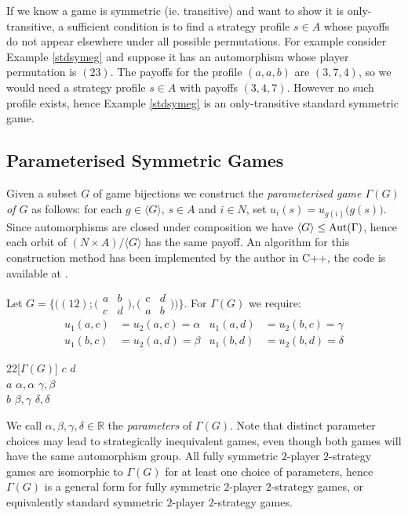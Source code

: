 If we know a game is symmetric (ie. transitive) and want to show it is only-transitive, a sufficient condition is to find a strategy profile $s \in A$ whose payoffs do not appear elsewhere under all possible permutations. For example consider Example \ref{stdsymeg} and suppose it has an automorphism whose player permutation is $(23)$. The payoffs for the profile $(a, a, b)$ are $(3, 7, 4)$, so we would need a strategy profile $s \in A$ with payoffs $(3, 4, 7)$. However no such profile exists, hence Example \ref{stdsymeg} is an only-transitive standard symmetric game.

\subsection{Parameterised Symmetric Games} \label{sec:parameterisedgames}
Given a subset $G$ of game bijections we construct the \textit{parameterised game $\Gamma(G)$ of $G$} as follows: for each $g \in \langle{G}\rangle$, $s \in A$ and $i \in N$, set $u_i(s) = u_{g(i)}\bigl(g(s)\bigr)$. Since automorphisms are closed under composition we have $\langle{G}\rangle \leq \operatorname*{Aut}(\Gamma)$, hence each orbit of $(N\times{A})/\langle{G}\rangle$ has the same payoff. An algorithm for this construction method has been implemented by the author in C++, the code is available at \cite{GLCode}.

\begin{example} \label{constructeg}
	Let $G = \{\bigl((12) ; \bigl(\begin{smallmatrix} a & b \\ c & d \end{smallmatrix}\bigr), \bigl(\begin{smallmatrix} c & d \\ a & b \end{smallmatrix}\bigr)\bigr)\}$. For $\Gamma(G)$ we require:
	\begin{align*}
		u_1(a, c) &= u_2(a, c) = \alpha   &   u_1(a, d) &= u_2(b, c) = \gamma \\
		u_1(b, c) &= u_2(a, d) = \beta   &   u_1(b, d) &= u_2(b, d) = \delta
	\end{align*} 
	\begin{center}
	\begin{game}{2}{2}[$\Gamma(G)$]
			  \> $c$  \> $d$ \\
		$a$   \> $\alpha, \alpha $  \> $\gamma, \beta $ \\
		$b$   \> $\beta, \gamma $  \> $\delta, \delta $
	\end{game}
	\end{center}
	
	We call $\alpha, \beta, \gamma, \delta \in \mathbb{R}$ the \textit{parameters} of $\Gamma(G)$. Note that distinct parameter choices may lead to strategically inequivalent games, even though both games will have the same automorphism group. All fully symmetric $2$-player $2$-strategy games are isomorphic to $\Gamma(G)$ for at least one choice of parameters, hence $\Gamma(G)$ is a general form for fully symmetric $2$-player $2$-strategy games, or equivalently standard symmetric $2$-player $2$-strategy games.
\end{example}


